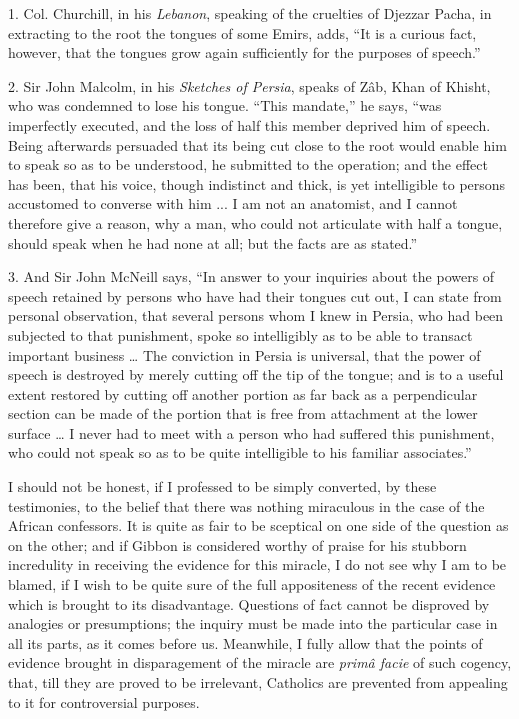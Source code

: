 1. Col. Churchill, in his \emph{Lebanon}, speaking of the
cruelties of Djezzar Pacha, in extracting to the root the tongues of
some Emirs, adds, ``It is a curious fact, however, that the tongues
grow again sufficiently for the purposes of speech.''

2. Sir John Malcolm, in his \emph{Sketches of Persia}, speaks of Zâb, Khan of
Khisht, who was condemned to lose his tongue. ``This
mandate,'' he says, ``was imperfectly executed, and the loss of
half this member deprived him of speech. Being afterwards persuaded that
its being cut close to the root would enable him to speak so as to be
understood, he submitted to the operation; and the effect has been, that
his voice, though indistinct and thick, is yet intelligible to persons
accustomed to converse with him ... I am not an anatomist, and I cannot
therefore give a reason, why a man, who could not articulate with half a
tongue, should speak when he had none at all; but the facts are as
stated.''

3. And Sir John McNeill says, ``In answer to your inquiries about
the powers of speech retained by persons who have had their tongues cut
out, I can state from personal observation, that several persons whom I
knew in Persia, who had been subjected to that punishment, spoke so
intelligibly as to be able to transact important business … The
conviction in Persia is universal, that the power of speech is destroyed
by merely cutting off the tip of the tongue; and is to a useful extent
restored by cutting off another portion as far back as a perpendicular
section can be made of the portion that is free from attachment at the
lower surface … I never had to meet with a person who had suffered
this punishment, who could not speak so as to be quite intelligible to
his familiar associates.''

I should not be honest, if I professed to be simply converted, by
these testimonies, to the belief that there was nothing miraculous in
the case of the African confessors. It is quite as fair to be sceptical
on one side of the question as on the other; and if Gibbon is considered
worthy of praise for his stubborn incredulity in receiving the evidence
for this miracle, I do not see why I am to be blamed, if I wish to
be quite sure of the full appositeness of the recent evidence which is
brought to its disadvantage. Questions of fact cannot be disproved by
analogies or presumptions; the inquiry must be made into the particular
case in all its parts, as it comes before us. Meanwhile, I fully allow
that the points of evidence brought in disparagement of the miracle are \emph{primâ
facie} of such cogency, that, till they are proved to be irrelevant,
Catholics are prevented from appealing to it for controversial
purposes.

